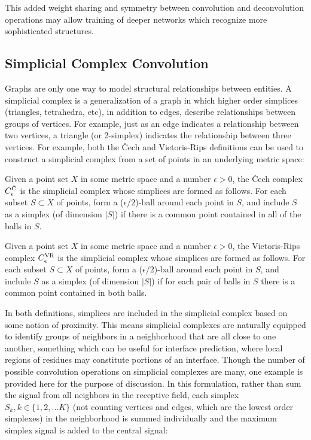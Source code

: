\noindent
This added weight sharing and symmetry between convolution and deconvolution operations may allow training of deeper networks which recognize more sophisticated structures.



\subsection{Simplicial Complex Convolution}

Graphs are only one way to model structural relationships between entities.
A simplicial complex is a generalization of a graph in which higher order simplices (triangles, tetrahedra, etc), in addition to edges, describe relationships between groups of vertices. 
For example, just as an edge indicates a relationship between two vertices, a triangle (or 2-simplex) indicates the relationship between three vertices.
For example, both the \v{C}ech and Vietoris-Rips definitions can be used to construct a simplicial complex from a set of points in an underlying metric space:

\begin{definition}
	Given a point set $X$ in some metric space and a number $\epsilon>0$, the \v{C}ech complex $C^{\textsc{\v{C}}}_\epsilon$ is the simplicial complex whose simplices are formed as follows. For each subset $S \subset X$ of points, form a ($\epsilon/2$)-ball around each point in $S$, and include $S$ as a simplex (of dimension $|S|$) if there is a common point contained in all of the balls in $S$.
\end{definition}

\begin{definition}
	Given a point set $X$ in some metric space and a number $\epsilon>0$, the Vietoris-Rips complex $C^{\textsc{VR}}_\epsilon$ is the simplicial complex whose simplices are formed as follows. For each subset $S \subset X$ of points, form a ($\epsilon/2$)-ball around each point in $S$, and include $S$ as a simplex (of dimension $|S|$) if for each pair of balls in $S$ there is a common point contained in both balls.
\end{definition}

In both definitions, simplices are included in the simplicial complex based on some notion of proximity.
This means simplicial complexes are naturally equipped to identify groups of neighbors in a neighborhood that are all close to one another, something which can be useful for interface prediction, where local regions of residues may constitute portions of an interface.
Though the number of possible convolution operations on simplicial complexes are many, one example is provided here for the purpose of discussion. 
In this formulation, rather than sum the signal from all neighbors in the receptive field, each simplex $S_k, k \in \{1, 2,... K\}$ (not counting vertices and edges, which are the lowest order simplexes) in the neighborhood is summed individually and the maximum simplex signal is added to the central signal:

